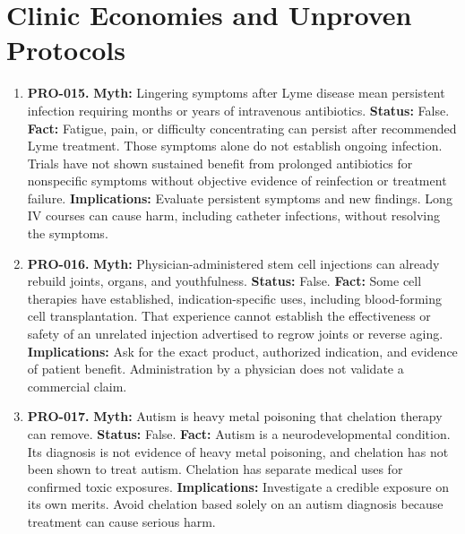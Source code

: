 \documentclass[11pt,oneside]{book}
\begin{document}
\section{Clinic Economies and Unproven Protocols}
\begin{enumerate}[leftmargin=0pt,labelwidth=0pt,labelsep=0pt,itemindent=0pt]
\item[] \textbf{PRO-015.} \textbf{Myth:} Lingering symptoms after Lyme disease mean persistent infection requiring months or years of intravenous antibiotics.\newline
\textbf{Status:} False.\newline
\textbf{Fact:} Fatigue, pain, or difficulty concentrating can persist after recommended Lyme treatment. Those symptoms alone do not establish ongoing infection. Trials have not shown sustained benefit from prolonged antibiotics for nonspecific symptoms without objective evidence of reinfection or treatment failure. \cite{ref165,ref493}\newline
\textbf{Implications:} Evaluate persistent symptoms and new findings. Long IV courses can cause harm, including catheter infections, without resolving the symptoms.
\item[] \textbf{PRO-016.} \textbf{Myth:} Physician-administered stem cell injections can already rebuild joints, organs, and youthfulness.\newline
\textbf{Status:} False.\newline
\textbf{Fact:} Some cell therapies have established, indication-specific uses, including blood-forming cell transplantation. That experience cannot establish the effectiveness or safety of an unrelated injection advertised to regrow joints or reverse aging. \cite{ref166}\newline
\textbf{Implications:} Ask for the exact product, authorized indication, and evidence of patient benefit. Administration by a physician does not validate a commercial claim.
\item[] \textbf{PRO-017.} \textbf{Myth:} Autism is heavy metal poisoning that chelation therapy can remove.\newline
\textbf{Status:} False.\newline
\textbf{Fact:} Autism is a neurodevelopmental condition. Its diagnosis is not evidence of heavy metal poisoning, and chelation has not been shown to treat autism. Chelation has separate medical uses for confirmed toxic exposures. \cite{ref167,ref131}\newline
\textbf{Implications:} Investigate a credible exposure on its own merits. Avoid chelation based solely on an autism diagnosis because treatment can cause serious harm.

\end{enumerate}
\end{document}
